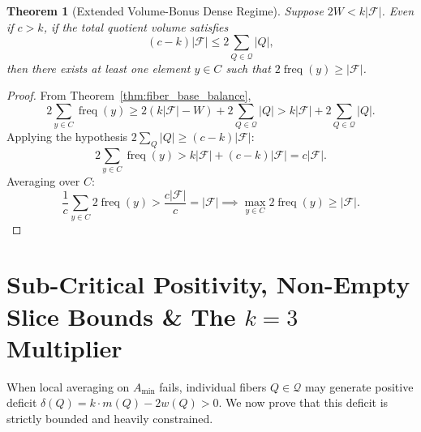 \documentclass[11pt,a4paper]{article}
\theoremstyle{plain}
\newtheorem{theorem}{Theorem}[section]
\theoremstyle{definition}
\theoremstyle{remark}
\newcommand{\F}{\mathcal{F}}
\newcommand{\Q}{\mathcal{Q}}
\newcommand{\freq}{\operatorname{freq}}
\begin{document}
\begin{theorem}[Extended Volume-Bonus Dense Regime]\label{thm:volume_bonus}
Suppose $2W < k|\F|$. Even if $c > k$, if the total quotient volume satisfies
\begin{equation}
(c - k)|\F| \le 2 \sum_{Q \in \Q} |Q|,
\end{equation}
then there exists at least one element $y \in C$ such that $2 \freq(y) \ge |\F|$.
\end{theorem}
\begin{proof}
From Theorem~\ref{thm:fiber_base_balance},
\begin{equation}
2 \sum_{y \in C} \freq(y) \ge 2(k|\F| - W) + 2 \sum_{Q \in \Q} |Q| > k|\F| + 2 \sum_{Q \in \Q} |Q|.
\end{equation}
Applying the hypothesis $2 \sum_Q |Q| \ge (c - k)|\F|$:
\begin{equation}
2 \sum_{y \in C} \freq(y) > k|\F| + (c - k)|\F| = c |\F|.
\end{equation}
Averaging over $C$:
\begin{equation}
\frac{1}{c} \sum_{y \in C} 2 \freq(y) > \frac{c |\F|}{c} = |\F| \implies \max_{y \in C} 2 \freq(y) \ge |\F|.
\end{equation}
\end{proof}

\section{Sub-Critical Positivity, Non-Empty Slice Bounds \& The $k=3$ Multiplier}\label{sec:subcritical}

When local averaging on $A_{\min}$ fails, individual fibers $Q \in \Q$ may generate positive deficit $\delta(Q) = k \cdot m(Q) - 2 w(Q) > 0$. We now prove that this deficit is strictly bounded and heavily constrained.
\end{document}
